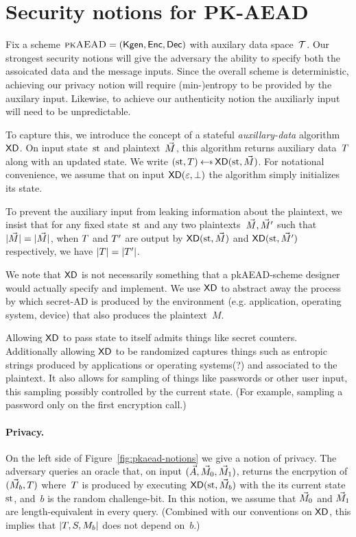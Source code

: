 
\section{Security notions for PK-AEAD} 
Fix a scheme $\textsc{pkAEAD}=(\mathsf{Kgen},{\mathsf{Enc}},{\mathsf{Dec}})$ with auxilary data space~$\mathcal{T}$.  Our strongest security notions will give the adversary the ability to specify both the assoicated data and the message inputs.  Since the overall scheme is deterministic, achieving our privacy notion will require (min-)entropy to be provided by the auxilary input.  Likewise, to achieve our authenticity notion the auxiliarly input will need to be unpredictable.

To capture this, we introduce the concept of a stateful \emph{auxillary-data} algorithm $\mathsf{XD}$.  On input state~$\mathrm{st}$ and plaintext~$\vec{M}$, this algorithm returns auxiliary data~$T$ along with an updated state.  We write $(\st,\umd) \getsr \mdalg(\st,\vmsg)$. For notational convenience, we assume that on input $\mathsf{XD}(\varepsilon,\bot)$ the algorithm simply initializes its state. 

To prevent the auxiliary input from leaking information about the plaintext, we insist that for any fixed state~$\mathrm{st}$ and any two plaintexts~$\vec{M},\vec{M}'$ such that $|\vec{M}|=|\vec{M}|$, when $T$ and $T'$ are output by $\mathsf{XD}(\mathrm{st},\vec{M})$ and $\mathsf{XD}(\mathrm{st},\vec{M}')$ respectively, we have $|T|=|T'|$. 

We note that $\mathsf{XD}$ is not necessarily something that a pkAEAD-scheme designer would actually specify and implement.  We use $\mathsf{XD}$ to abstract away the process by which secret-AD is produced by the environment (e.g. application, operating system, device) that also produces the plaintext~$M$. 

Allowing $\mathsf{XD}$ to pass state to itself admits things like secret counters.  Additionally allowing $\mathsf{XD}$ to be randomized captures things such as entropic strings produced by applications or operating systems(?) and associated to the plaintext.  It also allows for sampling of things like passwords or other user input, this sampling possibly controlled by the current state.  (For example, sampling a password only on the first encryption call.)


\paragraph{Privacy. }
On the left side of Figure~\ref{fig:pkaead-notions} we give a notion of privacy.  The adversary queries an oracle that, on input $(\vec{A},\vec{M}_0,\vec{M}_1)$, returns the encrpytion of $(\vec{M}_b,T)$ where~$T$ is produced by executing $\mathsf{XD}(\mathrm{st},\vec{M}_b)$ with the its current state~$\mathrm{st}$, and~$b$ is the random challenge-bit.  In this notion, we assume that $\vec{M}_0$ and $\vec{M}_1$ are length-equivalent in every query. (Combined with our conventions on $\mathsf{XD}$, this implies that $|T,S,M_b|$ does not depend on~$b$.) 


